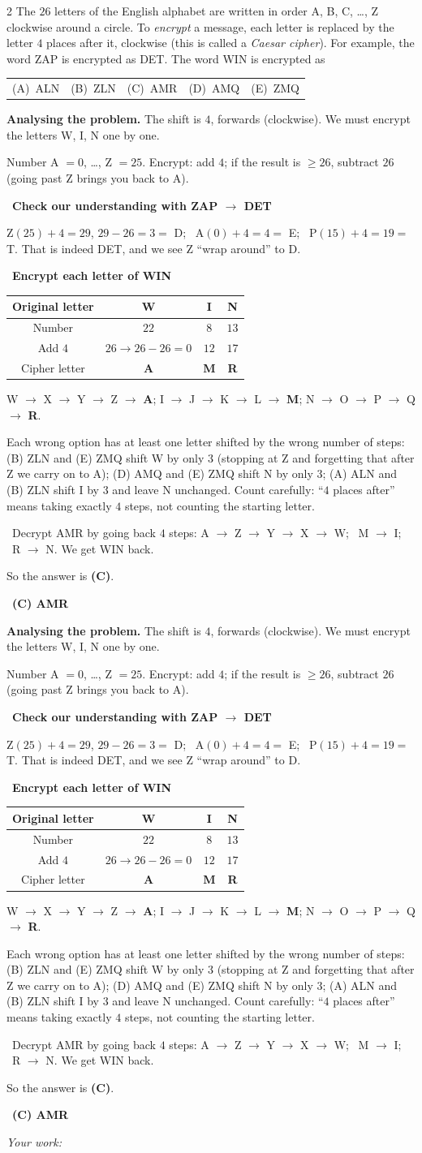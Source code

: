 \documentclass[11pt]{article}
\makeatletter
\newif\ifsol \soltrue
\providecommand{\AnsWord}{Đáp số}
\newenvironment{probbox}[2]{\begin{probboxT}{#1}{#2}}{\end{probboxT}}
\newcommand{\StuProb}[2]{\begin{probboxS}{#1}{#2}\StuProbBody\end{probboxS}}
\newcommand{\ans}[1]{\par\smallskip{\bfseries\color{tmGreen!88!black}\AnsWord:}\ {\bfseries\color{AnsRed}#1}\par}
\newcommand{\probsol}[1]{%
  \begin{lrbox}{\solmeasure}\begin{minipage}{\dimexpr\linewidth-24pt\relax}#1\end{minipage}\end{lrbox}%
  \ifsol
    \begin{solbox}#1\end{solbox}%
  \else
    \setlength{\solht}{\dimexpr\ht\solmeasure+\dp\solmeasure+0.85cm\relax}%
    \ifdim\solht<1.35cm\setlength{\solht}{1.35cm}\fi
    \ifdim\solht>\StudentMaxWork\setlength{\solht}{\StudentMaxWork}\fi
    \par\noindent\begin{minipage}{\linewidth}%
    \expandafter\StuProb\StuProbArgs
    \begin{tcolorbox}[colback=white,colframe=Line,boxrule=0.8pt,arc=5pt,
      left=8pt,right=8pt,top=4pt,bottom=4pt,height=\solht]{\footnotesize\color{Slate}\itshape\WorkWord}\end{tcolorbox}%
    \end{minipage}\par\medskip
  \fi}
\newlength{\StudentMaxWork}\setlength{\StudentMaxWork}{4.5cm}
\newcommand{\step}[2]{\par\smallskip\noindent{\bfseries\color{tmBlue!85!black}\StepWord~#1.}\ {\bfseries #2}\par\nopagebreak}
\newcommand{\verify}[1]{\par\smallskip\noindent{\bfseries\color{tmGreen!80!black}\faCheckCircle\ \CheckWord}\ #1\par}
\newcommand{\choices}[5]{\par\smallskip\noindent
  \begin{tabularx}{\linewidth}{@{}XXXXX@{}}(A)\ #1&(B)\ #2&(C)\ #3&(D)\ #4&(E)\ #5\end{tabularx}\par}
\def\WorkWord{Your work:}
\def\AnsWord{Answer}
\def\StepWord{Step}
\def\CheckWord{Check:}
\makeatother
\begin{document}
\begin{probbox}{2}{\relax}
The $26$ letters of the English alphabet are written in order A, B, C, \ldots, Z clockwise around a circle. To \emph{encrypt} a message,
each letter is replaced by the letter $4$ places after it, clockwise (this is called a \emph{Caesar cipher}). For example, the word ZAP
is encrypted as DET. The word WIN is encrypted as
\choices{ALN}{ZLN}{AMR}{AMQ}{ZMQ}
\end{probbox}
\probsol{
\textbf{Analysing the problem.} The shift is $4$, forwards (clockwise). We must encrypt the letters W, I, N one by one.
\begin{recallbox}Number A $= 0$, \ldots, Z $= 25$. Encrypt: add $4$; if the result is $\ge 26$, subtract $26$ (going past Z brings you back to A).\end{recallbox}
\step{1}{Check our understanding with ZAP $\to$ DET}
Z$(25) + 4 = 29$, $29 - 26 = 3 =$ D; \ A$(0) + 4 = 4 =$ E; \ P$(15) + 4 = 19 =$ T. That is indeed DET, and we see Z ``wrap around'' to D.
\step{2}{Encrypt each letter of WIN}
\begin{center}
\begin{tabular}{|c|c|c|c|}
\hline
\rowcolor{tmBlue!10} Original letter & W & I & N \\ \hline
Number & $22$ & $8$ & $13$ \\ \hline
Add $4$ & $26 \to 26 - 26 = 0$ & $12$ & $17$ \\ \hline
Cipher letter & \textbf{A} & \textbf{M} & \textbf{R} \\ \hline
\end{tabular}
\end{center}
\begin{center}
W $\to$ X $\to$ Y $\to$ Z $\to$ \textbf{A}; \qquad I $\to$ J $\to$ K $\to$ L $\to$ \textbf{M}; \qquad N $\to$ O $\to$ P $\to$ Q $\to$ \textbf{R}.
\end{center}
\begin{warnbox}Each wrong option has at least one letter shifted by the wrong number of steps: (B) ZLN and (E) ZMQ shift W by only $3$
(stopping at Z and forgetting that after Z we carry on to A); (D) AMQ and (E) ZMQ shift N by only $3$; (A) ALN and (B) ZLN shift I by
$3$ and leave N unchanged. Count carefully: ``$4$ places after'' means taking exactly $4$ steps, not counting the starting letter.\end{warnbox}
\verify{Decrypt AMR by going back $4$ steps: A $\to$ Z $\to$ Y $\to$ X $\to$ W; \ M $\to$ I; \ R $\to$ N. We get WIN back.}
So the answer is \textbf{(C)}.
\ans{(C) AMR}
}
\end{document}
